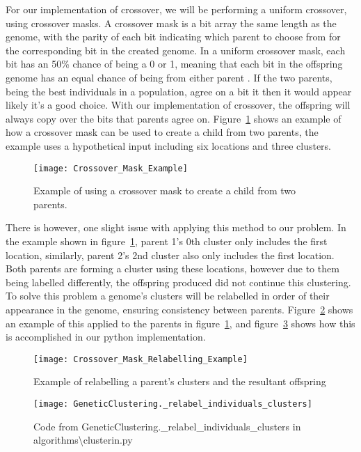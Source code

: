 \noindent
For our implementation of crossover, we will be performing a uniform crossover, using crossover masks.
A crossover mask is a bit array the same length as the genome, with the parity of each bit indicating which parent
to choose from for the corresponding bit in the created genome.
In a uniform crossover mask, each bit has an 50\% chance of being a 0 or 1, meaning that each bit in the offspring
genome has an equal chance of being from either parent
.
If the two parents, being the best individuals in a population, agree on a bit it then it would appear likely it's a
good choice.
With our implementation of crossover, the offspring will always copy over the bits that parents agree on.
Figure~\ref{fig:Crossover_Mask_Example} shows an example of how a crossover mask can be used to create a child from
two parents, the example uses a hypothetical input including six locations and three clusters.
\begin{figure}[H]
    \centering
    \texttt{[image: Crossover\_Mask\_Example]}
    \caption{Example of using a crossover mask to create a child from two parents.}
    \label{fig:Crossover_Mask_Example}
\end{figure}

\noindent
There is however, one slight issue with applying this method to our problem.
In the example shown in figure~\ref{fig:Crossover_Mask_Example}, parent 1's 0th cluster only includes the first
location, similarly, parent 2's 2nd cluster also only includes the first location.
Both parents are forming a cluster using these locations, however due to them being labelled differently, the
offspring produced did not continue this clustering.
To solve this problem a genome's clusters will be relabelled in order of their appearance in the genome, ensuring
consistency between parents.
Figure~\ref{fig:Crossover_Mask_Relabelling_Example} shows an example of this applied to the parents in figure~\ref{fig:Crossover_Mask_Example},
and figure~\ref{fig:GeneticClustering._relabel_individuals_clusters} shows how this is accomplished in our python
implementation.
\begin{figure}[H]
    \centering
    \texttt{[image: Crossover\_Mask\_Relabelling\_Example]}
    \caption{Example of relabelling a parent's clusters and the resultant offspring}
    \label{fig:Crossover_Mask_Relabelling_Example}
\end{figure}
\begin{figure}[H]
    \centering
    \texttt{[image: GeneticClustering.\_relabel\_individuals\_clusters]}
    \caption{Code from GeneticClustering.\_relabel\_individuals\_clusters in algorithms\textbackslash clusterin.py}
    \label{fig:GeneticClustering._relabel_individuals_clusters}
\end{figure}

